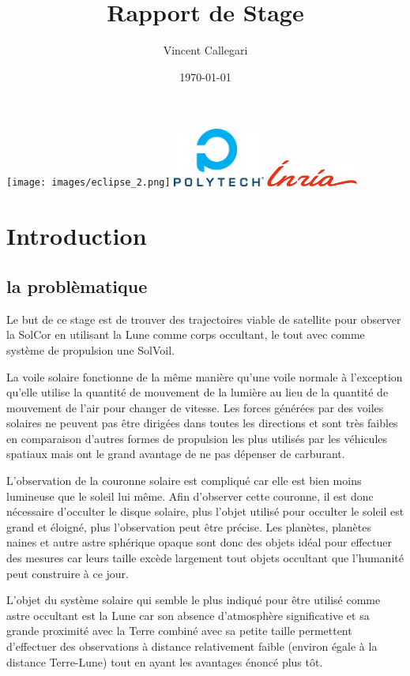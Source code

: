\documentclass{article} %
\title{Rapport de Stage} %
\author{Vincent Callegari} %
\date{\today} %
\begin{document}
		\maketitle
		\texttt{[image: images/eclipse\_2.png]}
		\vfill
		\includegraphics[width=3cm]{images/Logo_Reseau_Polytech.png} \hfill \includegraphics[width=3cm]{images/inria.png}
		\newpage
		\tableofcontents
		\newpage
		\section{Introduction}
		
		\subsection{la problèmatique}
		Le but de ce stage est de trouver des trajectoires viable de satellite pour observer la \gls{SolCor} en utilisant la Lune comme corps occultant, le tout avec comme système de propulsion une \gls{SolVoil}.
		
		La voile solaire fonctionne de la même manière qu'une voile normale à l'exception qu'elle utilise la quantité de mouvement de la lumière au lieu de la quantité de mouvement de l'air pour changer de vitesse. Les forces générées par des voiles solaires ne peuvent pas être dirigées dans toutes les directions et sont très faibles en comparaison d'autres formes de propulsion les plus utilisés par les véhicules spatiaux mais ont le grand avantage de ne pas dépenser de carburant.
		
		L'observation de la couronne solaire est compliqué car elle est bien moins lumineuse que le soleil lui même. Afin d'observer cette couronne, il est donc nécessaire d'occulter le disque solaire, plus l'objet utilisé pour occulter le soleil est grand et éloigné, plus l'observation peut être précise. Les planètes, planètes naines et autre astre sphérique opaque sont donc des objets idéal pour effectuer des mesures car leurs taille excède largement tout objets occultant que l'humanité peut construire à ce jour.
		
		L'objet du système solaire qui semble le plus indiqué pour être utilisé comme astre occultant est la Lune car son absence d'atmosphère significative et sa grande proximité avec la Terre combiné avec sa petite taille permettent d'effectuer des observations à distance relativement faible (environ égale à la distance Terre-Lune) tout en ayant les avantages énoncé plus tôt.
		
\end{document}
